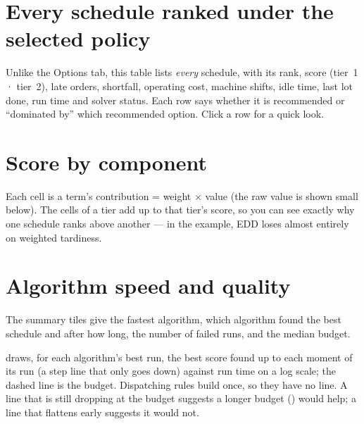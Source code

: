 \section{Every schedule ranked under the selected policy}


Unlike the Options tab, this table lists \emph{every} schedule, with its rank, score (tier~1 · tier~2), late
orders, shortfall, operating cost, machine shifts, idle time, last lot done, run time and solver status. Each
row says whether it is recommended or ``dominated by'' which recommended option. Click a row for a quick look.

\section{Score by component}


Each cell is a term's contribution = weight $\times$ value (the raw value is shown small below). The cells of a
tier add up to that tier's score, so you can see exactly why one schedule ranks above another --- in the
example, EDD loses almost entirely on weighted tardiness.

\section{Algorithm speed and quality}

The summary tiles give the fastest algorithm, which algorithm found the best schedule and after how long, the
number of failed runs, and the median budget.


 draws, for each algorithm's best run, the best score found up to each moment of
its run (a step line that only goes down) against run time on a log scale; the dashed line is the budget.
Dispatching rules build once, so they have no line. A line that is still dropping at the budget suggests a
longer budget () would help; a line that flattens early suggests it would not.


